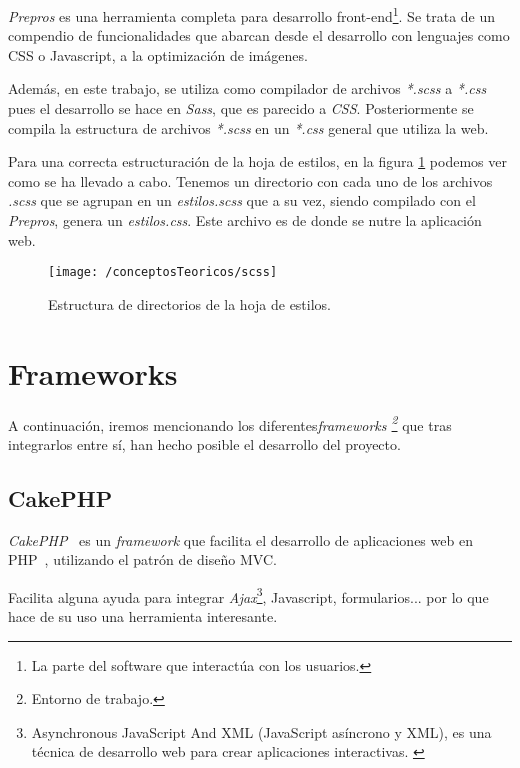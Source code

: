 \textit{Prepros} es una herramienta completa para desarrollo front-end\footnote{La parte del software que interactúa con los usuarios.}. Se trata de un compendio de funcionalidades que abarcan desde el desarrollo con lenguajes como CSS o Javascript, a la optimización de imágenes.

Además, en este trabajo, se utiliza como compilador de archivos \textit{*.scss} a \textit{*.css} pues el desarrollo se hace en \textit{Sass}, que es parecido a \textit{CSS}. Posteriormente se compila la estructura de archivos \textit{*.scss} en un \textit{*.css} general que utiliza la web.

Para una correcta estructuración de la hoja de estilos, en la figura \ref{fig:scss} podemos ver como se ha llevado a cabo.
Tenemos un directorio con cada uno de los archivos \textit{.scss} que se agrupan en un \textit{estilos.scss} que a su vez, siendo compilado con el \textit{Prepros}, genera un \textit{estilos.css}. Este archivo es de donde se nutre la aplicación web.

\begin{figure}[ht]
	\centering
	\texttt{[image: /conceptosTeoricos/scss]}
	\caption{Estructura de directorios de la hoja de estilos.}
	\label{fig:scss}
\end{figure}

\newpage

\section{Frameworks }

A continuación, iremos mencionando los diferentes\textit{frameworks \footnote{Entorno de trabajo.}} que tras integrarlos entre sí, han hecho posible el desarrollo del proyecto.

\subsection{CakePHP}

\textit{CakePHP}~\cite{web:cakephp} es un \textit{framework} que facilita el desarrollo de aplicaciones web en PHP~\cite{wiki:cakephp}, utilizando el patrón de diseño MVC.

Facilita alguna ayuda para integrar \textit{Ajax}\footnote{Asynchronous JavaScript And XML (JavaScript asíncrono y XML), es una técnica de desarrollo web para crear aplicaciones interactivas. \cite{wiki:ajax}}, Javascript, formularios... por lo que hace de su uso una herramienta interesante.

